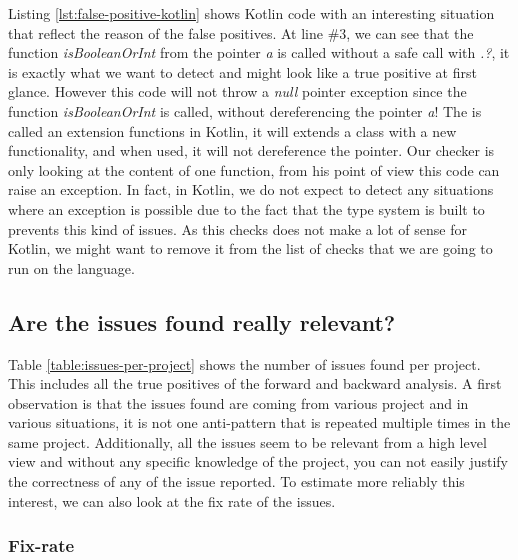 \begin{enumerate}
	
	
	Listing \ref{lst:false-positive-kotlin} shows Kotlin code with an interesting situation that reflect the reason of the false positives. 
	At line $\#3$, we can see that the function \emph{isBooleanOrInt} from the pointer \emph{a} is called without a safe call with \emph{.?}, it is exactly what we want to detect and might look like a true positive at first glance. 
	However this code will not throw a \emph{null} pointer exception since the function \emph{isBooleanOrInt} is called, without dereferencing the pointer \emph{a}! 
	The is called an extension functions \cite{kotlinExtensionFun:2019:Online} in Kotlin, it will extends a class with a new functionality, and when used, it will not dereference the pointer.
	Our checker is only looking at the content of one function, from his point of view this code can raise an exception.
	In fact, in Kotlin, we do not expect to detect any situations where an exception is possible due to the fact that the type system is built to prevents this kind of issues.
	As this checks does not make a lot of sense for Kotlin, we might want to remove it from the list of checks that we are going to run on the language.
\end{enumerate}

\subsection{Are the issues found really relevant?}
\label{subsec:are_the_issues_relevant}

Table \ref{table:issues-per-project} shows the number of issues found per project. 
This includes all the true positives of the forward and backward analysis. 
A first observation is that the issues found are coming from various project and in various situations, it is not one anti-pattern that is repeated multiple times in the same project. 
Additionally, all the issues seem to be relevant from a high level view and without any specific knowledge of the project, you can not easily justify the correctness of any of the issue reported. 
To estimate more reliably this interest, we can also look at the fix rate of the issues.

\subsubsection{Fix-rate}
\label{subsubsec:fix_rate}

